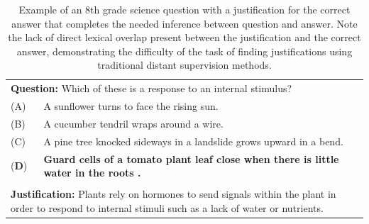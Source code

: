 \begin{table}[t]
\begin{center}
\begin{tabularx}{\linewidth}{p{1cm}p{13cm}}
\multicolumn{2}{p{15cm}}{\textbf{Question:} Which of these is a response to an internal stimulus?} \\
 (A) & A sunflower turns to face the rising sun. \\
 (B) & A cucumber tendril wraps around a wire. \\
 (C) &  A pine tree knocked sideways in a landslide grows upward in a bend. \\
 (\textbf{D}) &\textbf{Guard cells of a tomato plant leaf close when there is little water in the roots .} \\
\\
\multicolumn{2}{p{15cm}}{\textbf{Justification:} 
Plants rely on hormones to send signals within the plant in order to respond to internal stimuli such as a lack of water or nutrients. } \\
\end{tabularx}

\caption{{  Example of an 8th grade science question with a justification for the correct answer that completes the needed inference between question and answer.  Note the lack of direct lexical overlap present between the justification and the correct answer, demonstrating the difficulty of the task of finding justifications using traditional distant supervision methods. }}

\label{tab:question_example}
\end{center}
\end{table}

